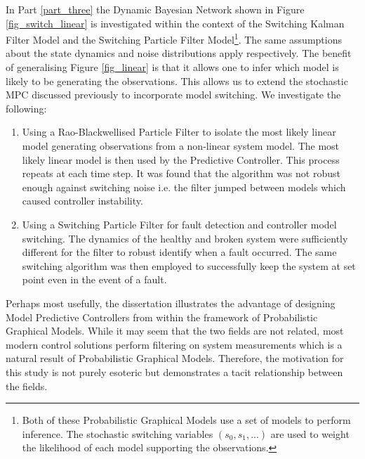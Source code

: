 In Part \ref{part_three} the Dynamic Bayesian Network shown in Figure \ref{fig_switch_linear} is investigated within the context of the Switching Kalman Filter Model and the Switching Particle Filter Model\footnote{Both of these Probabilistic Graphical Models use a set of models to perform inference. The stochastic switching variables $(s_0, s_1,...)$ are used to weight the likelihood of each model supporting the observations.}. The same assumptions about the state dynamics and noise distributions apply respectively. The benefit of generalising Figure \ref{fig_linear} is that it allows one to infer which model is likely to be generating the observations. This allows us to extend the stochastic MPC discussed previously to incorporate model switching. We investigate the following:
\begin{enumerate}
\item
Using a Rao-Blackwellised Particle Filter to isolate the most likely linear model generating observations from a non-linear system model. The most likely linear model is then used by the Predictive Controller. This process repeats at each time step. It was found that the algorithm was not robust enough against switching noise i.e. the filter jumped between models which caused controller instability.
\item
Using a Switching Particle Filter for fault detection and controller model switching. The dynamics of the healthy and broken system were sufficiently different for the filter to robust identify when a fault occurred. The same switching algorithm was then employed to successfully keep the system at set point even in the event of a fault.  
\end{enumerate}

Perhaps most usefully, the dissertation illustrates the advantage of designing Model Predictive Controllers from within the framework of Probabilistic Graphical Models. While it may seem that the two fields are not related, most modern control solutions perform filtering on system measurements which is a natural result of Probabilistic Graphical Models. Therefore, the motivation for this study is not purely esoteric but demonstrates a tacit relationship between the fields.   

